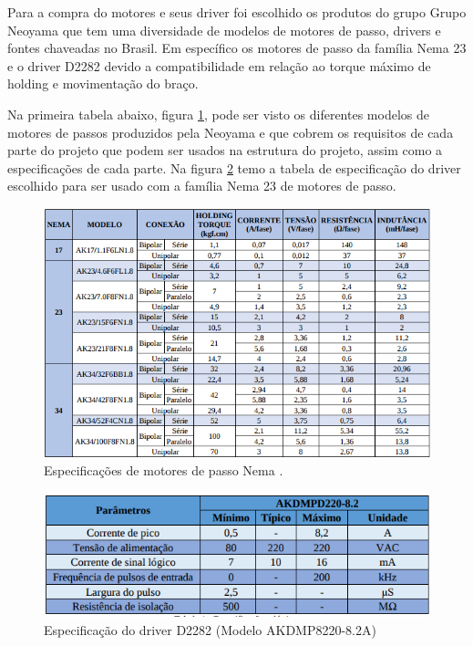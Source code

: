 Para a compra do motores e seus driver foi escolhido os produtos do grupo Grupo Neoyama que tem uma diversidade de modelos de motores de passo, drivers e fontes chaveadas no Brasil. Em específico os motores de passo da família Nema 23 e o driver D2282 devido a compatibilidade em relação ao torque máximo de holding e movimentação do braço. 

Na primeira tabela abaixo, figura \ref{des_fig14}, pode ser visto os diferentes modelos de motores de passos produzidos pela Neoyama e que cobrem os requisitos de cada parte do projeto que podem ser usados na estrutura do projeto, assim como a especificações de cada parte.  Na figura \ref{des_fig15} temo a tabela de especificação do driver escolhido para ser usado com a família Nema 23 de motores de passo.
\begin{figure}[H]
	\centering	\includegraphics[keepaspectratio=true,scale=0.8]{figuras/tab1_des_eletronica.png}
	\caption{Especificações de motores de passo Nema \cite{passomotormanual}.}
	\label{des_fig14}
\end{figure}
\begin{figure}[H]
	\centering	\includegraphics[keepaspectratio=true,scale=0.6]{figuras/tab3_des_eletronica.png}
	\caption{Especificação do driver D2282 (Modelo AKDMP8220-8.2A) \cite{drivermanual}}
	\label{des_fig15}
\end{figure}

